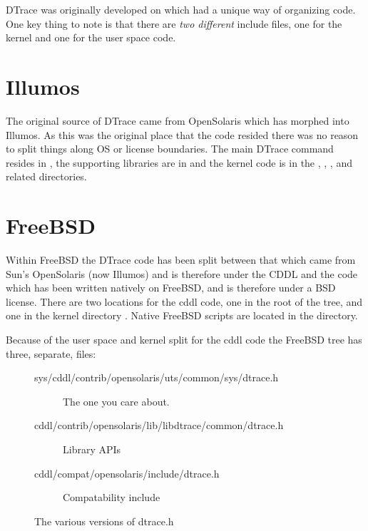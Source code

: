DTrace was originally developed on  which had a
unique way of organizing code.  One key thing to note is that there
are \emph{two different}  include files, one for the
kernel and one for the user space code.

\section{Illumos}
\label{sec:illumos-code}

The original source of DTrace came from OpenSolaris which has morphed
into Illumos.  As this was the original place that the code resided
there was no reason to split things along OS or license boundaries.
The main DTrace command resides in , the supporting
libraries are in  and the kernel code is in
the , , ,
and related directories.

\section{FreeBSD}
\label{sec:freebsd-code}

Within FreeBSD the DTrace code has been split between that which came
from Sun's OpenSolaris (now Illumos) and is therefore under the CDDL
and the code which has been written natively on FreeBSD, and is
therefore under a BSD license.  There are two locations for the cddl
code, one in the root of the tree,  and one in the
kernel directory .  Native FreeBSD scripts are
located in the  directory.

Because of the user space and kernel split for the cddl code the
FreeBSD tree has three, separate,  files:

\begin{figure}
  \centering
\begin{description}
\item [sys/cddl/contrib/opensolaris/uts/common/sys/dtrace.h] The one
  you care about.
\item [cddl/contrib/opensolaris/lib/libdtrace/common/dtrace.h] Library APIs
\item [cddl/compat/opensolaris/include/dtrace.h] Compatability include
\end{description}
  \caption{The various versions of dtrace.h}
  \label{fig:freebsd-dtrace-h}
\end{figure}

